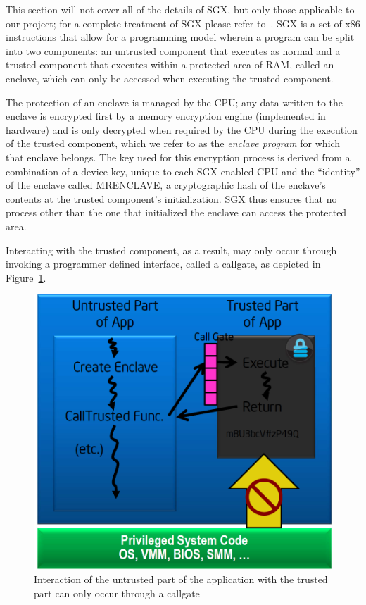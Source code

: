 \documentclass[../main.tex]{subfiles}
\begin{document}
This section will not cover all of the details of SGX, but only those
applicable to our project; for a complete treatment of SGX please
refer to~\cite{IntelCorporation2010}. \Intel SGX is a set of x86
instructions that allow for a programming model wherein a program can
be split into two components: an untrusted component that executes as
normal and a trusted component that executes within a protected area
of RAM, called an enclave, which can only be accessed when executing
the trusted component.

The protection of an enclave is managed by the CPU; any data written
to the enclave is encrypted first by a memory encryption engine
(implemented in hardware) and is only decrypted when required by the
CPU during the execution of the trusted component, which we refer to
as the \textit{enclave program} for which that enclave belongs. The
key used for this encryption process is derived from a combination of
a device key, unique to each SGX-enabled CPU and the ``identity'' of
the enclave called MRENCLAVE, a cryptographic hash of the enclave's
contents at the trusted component's initialization. SGX thus ensures
that no process other than the one that initialized the enclave can
access the protected area.

Interacting with the trusted component, as a result, may only occur
through invoking a programmer defined interface, called a callgate, as
depicted in Figure~\ref{fig:sgxhighlevel}.

\begin{figure}[H]
  \centering
  \includegraphics[scale=0.25]{images/sgxhighlevel.png}
  \caption{Interaction of the untrusted part of the application with
    the trusted part can only occur through a callgate}
  \label{fig:sgxhighlevel}
\end{figure}
\end{document}

